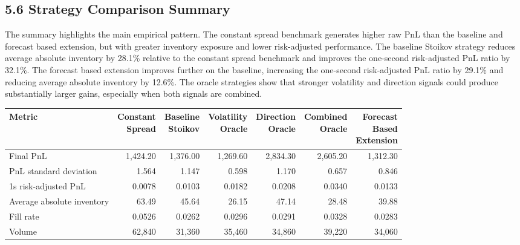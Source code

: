 \documentclass[12pt,a4paper]{article}
\begin{document}
\subsection{5.6 Strategy Comparison
Summary}\label{strategy-comparison-summary}

The summary highlights the main empirical pattern. The constant spread
benchmark generates higher raw PnL than the baseline and forecast based
extension, but with greater inventory exposure and lower risk-adjusted
performance. The baseline Stoikov strategy reduces average absolute
inventory by 28.1\% relative to the constant spread benchmark and
improves the one-second risk-adjusted PnL ratio by 32.1\%. The forecast
based extension improves further on the baseline, increasing the
one-second risk-adjusted PnL ratio by 29.1\% and reducing average
absolute inventory by 12.6\%. The oracle strategies show that stronger
volatility and direction signals could produce substantially larger
gains, especially when both signals are combined.

\begingroup\scriptsize{}\setlength{\tabcolsep}{6pt}
\renewcommand{\arraystretch}{1.25}
\begin{tabular*}{\textwidth}{@{\extracolsep{\fill}} lrrrrrr @{}}
\toprule
Metric &
\shortstack[r]{Constant\\Spread} &
\shortstack[r]{Baseline\\Stoikov} &
\shortstack[r]{Volatility\\Oracle} &
\shortstack[r]{Direction\\Oracle} &
\shortstack[r]{Combined\\Oracle} &
\shortstack[r]{Forecast\\Based\\Extension} \\
\midrule
Final PnL & 1,424.20 & 1,376.00 & 1,269.60 & 2,834.30 & 2,605.20 & 1,312.30 \\
PnL standard deviation & 1.564 & 1.147 & 0.598 & 1.170 & 0.657 & 0.846 \\
1s risk-adjusted PnL & 0.0078 & 0.0103 & 0.0182 & 0.0208 & 0.0340 & 0.0133 \\
Average absolute inventory & 63.49 & 45.64 & 26.15 & 47.14 & 28.48 & 39.88 \\
Fill rate & 0.0526 & 0.0262 & 0.0296 & 0.0291 & 0.0328 & 0.0283 \\
Volume & 62,840 & 31,360 & 35,460 & 34,860 & 39,220 & 34,060 \\
\bottomrule
\end{tabular*}
\endgroup
\end{document}
